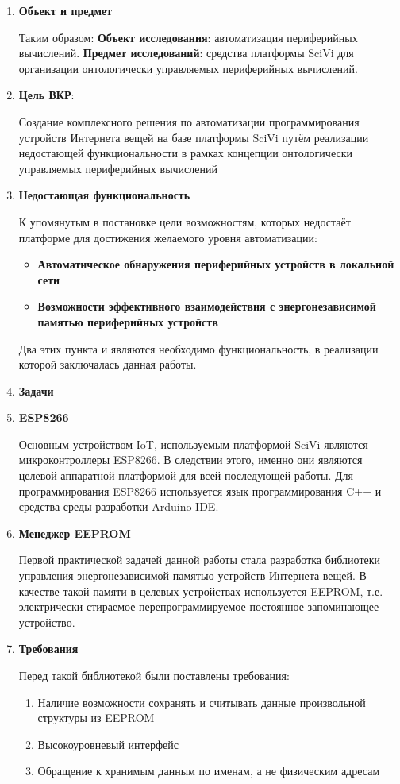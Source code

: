 \documentclass[14pt]{extarticle}
\begin{document}
\begin{enumerate}
	\item \textbf{Объект и предмет}

	Таким образом:
	\textbf{Объект исследования}: автоматизация периферийных вычислений.
	\textbf{Предмет исследований}: средства платформы SciVi для организации онтологически управляемых периферийных вычислений.

	\item \textbf{Цель ВКР}:

	Создание комплексного решения по  автоматизации программирования устройств Интернета вещей на базе платформы SciVi путём реализации недостающей функциональности в рамках концепции онтологически управляемых периферийных вычислений

	\item \textbf{Недостающая функциональность}

	К упомянутым в постановке цели возможностям, которых недостаёт платформе для достижения желаемого уровня автоматизации:
	\begin{itemize}
		\item \textbf{Автоматическое обнаружения периферийных устройств в локальной сети}
		\item \textbf{Возможности эффективного взаимодействия с энергонезависимой памятью периферийных устройств}
	\end{itemize}
	Два этих пункта и являются необходимо функциональность, в реализации которой заключалась данная работы.
	\item \textbf{Задачи}

	\item \textbf{ESP8266}

	Основным устройством IoT, используемым платформой SciVi являются микроконтроллеры ESP8266.
	В следствии этого, именно они являются целевой аппаратной платформой для всей последующей работы.
	Для программирования ESP8266 используется язык программирования C++ и средства среды разработки Arduino IDE.

	\item \textbf{Менеджер EEPROM}

	Первой практической задачей данной работы стала разработка библиотеки управления энергонезависимой памятью устройств Интернета вещей.
	В качестве такой памяти в целевых устройствах используется EEPROM, т.е. электрически стираемое перепрограммируемое постоянное запоминающее устройство.

	\item \textbf{Требования}

	Перед такой библиотекой были поставлены требования:
	\begin{enumerate}
		\item Наличие возможности сохранять и считывать данные произвольной структуры из EEPROM
		\item Высокоуровневый интерфейс
		\item Обращение к хранимым данным по именам, а не физическим адресам
	\end{enumerate}


\end{enumerate}
\end{document}
